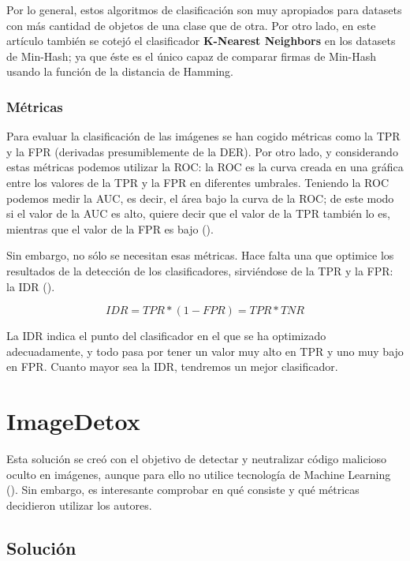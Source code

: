 Por lo general, estos algoritmos de clasificación son muy apropiados para datasets con más cantidad de objetos de una clase que de otra. Por otro lado, en este artículo también se cotejó el clasificador \textbf{K-Nearest Neighbors} en los datasets de Min-Hash; ya que éste es el único capaz de comparar firmas de Min-Hash usando la función de la distancia de Hamming.

\subsubsection{Métricas}

Para evaluar la clasificación de las imágenes se han cogido métricas como la \ac{TPR} y la \ac{FPR} (derivadas presumiblemente de la \ac{DER}). Por otro lado, y considerando estas métricas podemos utilizar la \ac{ROC}: la \ac{ROC} es la curva creada en una gráfica entre los valores de la \ac{TPR} y la \ac{FPR} en diferentes umbrales. Teniendo la \ac{ROC} podemos medir la \ac{AUC}, es decir, el área bajo la curva de la \ac{ROC}; de este modo si el valor de la \ac{AUC} es alto, quiere decir que el valor de la \ac{TPR} también lo es, mientras que el valor de la \ac{FPR} es bajo (\cite{auc}). %

Sin embargo, no sólo se necesitan esas métricas. Hace falta una que optimice los resultados de la detección de los clasificadores, sirviéndose de la \ac{TPR} y la \ac{FPR}: la \ac{IDR} (\cite{idr}). %

\begin{equation}
IDR = TPR*(1 - FPR) = TPR*TNR
\end{equation}

La \ac{IDR} indica el punto del clasificador en el que se ha optimizado adecuadamente, y todo pasa por tener un valor muy alto en \ac{TPR} y uno muy bajo en \ac{FPR}. Cuanto mayor sea la \ac{IDR}, tendremos un mejor clasificador.

\section{ImageDetox}
\label{sec:imagedetox}

Esta solución se creó con el objetivo de detectar y neutralizar código malicioso oculto en imágenes, aunque para ello no utilice tecnología de Machine Learning (\cite{imagedetox}). Sin embargo, es interesante comprobar en qué consiste y qué métricas decidieron utilizar los autores. %

\subsection{Solución}

